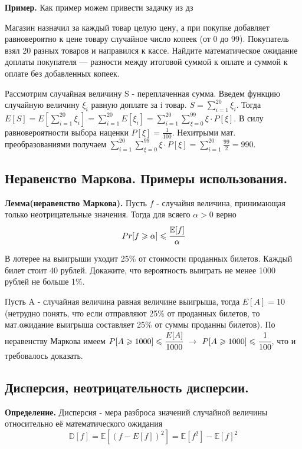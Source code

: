 \documentclass[a4paper, 10pt]{article}
\begin{document}
\textbf{Пример.} Как пример можем привести задачку из дз
\begin{problem}{2}
Магазин назначил за каждый товар целую цену, а при покупке добавляет равновероятно к цене товару случайное число копеек (от 0 до 99). Покупатель взял 20 разных товаров и направился к кассе. Найдите математическое ожидание доплаты покупателя — разности между итоговой суммой к оплате и суммой к оплате без добавленных копеек.
\end{problem}
Рассмотрим случайная величину S - переплаченная сумма. Введем функцию случайную величину $\xi_i$ равную доплате за i товар. $S = \sum^{20}_{i=1} \xi_i$. Тогда $E[S] = E[\sum^{20}_{i=1} \xi_i] = \sum^{20}_{i=1} E[\xi_i] = \sum^{20}_{i=1} \sum^{99}_{\xi = 0} \xi \cdot P[\xi]$. В силу равновероятности выбора наценки $P[\xi] = \frac{1}{100}$. Нехитрыми мат. преобразованиями получаем $\sum^{20}_{i=1} \sum^{99}_{\xi = 0} \xi \cdot P[\xi] = \sum^{20}_{i=1} \frac{99}{2} = 990$.

\subsection{Неравенство Маркова. Примеры использования.}

\textbf{Лемма(неравенство Маркова).} Пусть $f$ - случайня величина, принимающая только неотрицательные значения. Тогда для всяего $\alpha > 0$ верно $$Pr[f \geqslant \alpha] \leqslant \cfrac{\mathbb{E}[f]}{\alpha}$$

\begin{problem}{1}
 В лотерее на выигрыши уходит 25\% от стоимости проданных билетов. Каждый билет стоит 40 рублей. Докажите, что вероятность выиграть не менее 1000 рублей не больше 1\%.
\end{problem}

Пусть A - случайная величина равная величине выигрыша, тогда $E[A] = 10$(нетрудно понять, что если отправляют 25\% от проданных билетов, то мат.ожидание выигрыша составляет 25\% от суммы проданны билетов). По неравенству Маркова имеем $P[A \geqslant 1000] \leqslant \cfrac{E[A]}{1000}$ $\to$ $P[A \geqslant 1000] \leqslant \cfrac{1}{100}$, что и требовалось доказать.

\subsection{Дисперсия, неотрицательность дисперсии.}

\textbf{Определение.} Дисперсия - мера разброса значений случайной величины относительно её математического ожидания $$\mathbb{D}[f] = \mathbb{E}[(f - E[f ])^2] = \mathbb{E}[f^2] - \mathbb{E}[f]^2$$
\end{document}
